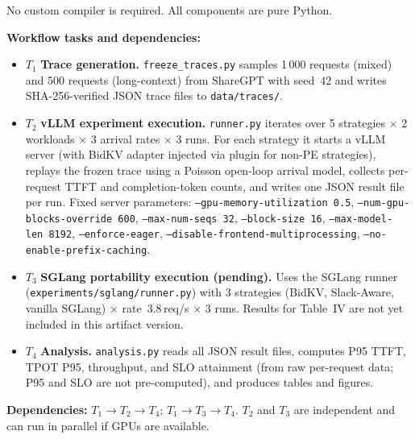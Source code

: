 \documentclass[conference]{IEEEtran}
\begin{document}
No custom compiler is required.
All components are pure Python.

\artcomp

\textbf{Workflow tasks and dependencies:}

\begin{itemize}
  \item $T_1$ \textbf{Trace generation.}
    \texttt{freeze\_traces.py} samples 1\,000 requests (mixed) and 500
    requests (long-context) from ShareGPT with seed~42 and writes
    SHA-256-verified JSON trace files to \texttt{data/traces/}.

  \item $T_2$ \textbf{vLLM experiment execution.}
    \texttt{runner.py} iterates over 5 strategies $\times$ 2 workloads
    $\times$ 3 arrival rates $\times$ 3 runs.
    For each strategy it starts a vLLM server (with BidKV adapter injected
    via plugin for non-PE strategies), replays the frozen trace using a
    Poisson open-loop arrival model, collects per-request TTFT and
    completion-token counts, and writes one JSON result file per run.
    Fixed server parameters: \texttt{--gpu-memory-utilization~0.5},
    \texttt{--num-gpu-blocks-override~600}, \texttt{--max-num-seqs~32},
    \texttt{--block-size~16}, \texttt{--max-model-len~8192},
    \texttt{--enforce-eager}, \texttt{--disable-frontend-multiprocessing},
    \texttt{--no-enable-prefix-caching}.

  \item $T_3$ \textbf{SGLang portability execution (pending).}
    Uses the SGLang runner (\texttt{experiments/sglang/runner.py}) with
    3 strategies (BidKV, Slack-Aware, vanilla SGLang) $\times$
    rate~3.8\,req/s $\times$ 3 runs.
    Results for Table~IV are not yet included in this artifact version.

  \item $T_4$ \textbf{Analysis.}
    \texttt{analysis.py} reads all JSON result files, computes P95 TTFT,
    TPOT P95, throughput, and SLO attainment (from raw per-request data;
    P95 and SLO are not pre-computed), and produces tables and figures.

\end{itemize}

\textbf{Dependencies:} $T_1 \rightarrow T_2 \rightarrow T_4$;
$T_1 \rightarrow T_3 \rightarrow T_4$.
$T_2$ and $T_3$ are independent and can run in parallel if GPUs are available.
\end{document}
